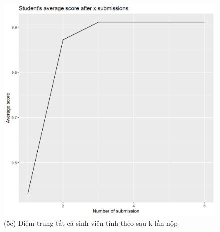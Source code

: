 \documentclass[a4paper]{article}
\theoremstyle{definition}
\begin{document}
\begin{figure}[!ht]
    \centering
    \includegraphics[scale=0.4]{Pics/q5c_file1.png}
    \caption{(5c) Điểm trung tất cả sinh viên tính theo sau k lần nộp}
    \label{fig:my_label}
\end{figure}

\newpage
\end{document}
